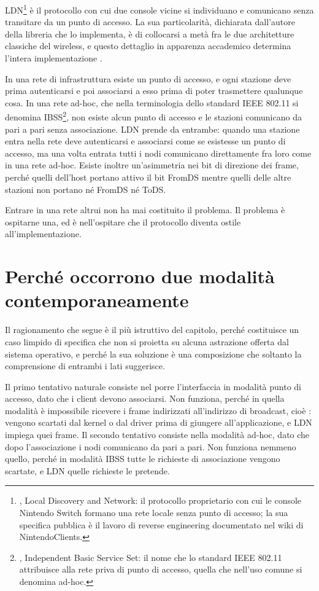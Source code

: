 LDN\footnote{, Local Discovery and Network: il protocollo proprietario con cui le console Nintendo Switch formano una rete locale senza punto di accesso; la sua specifica pubblica è il lavoro di reverse engineering documentato nel wiki di NintendoClients.} è il protocollo con cui due console vicine si individuano e comunicano senza transitare da un punto di accesso. La sua particolarità, dichiarata dall'autore della libreria che lo implementa, è di collocarsi a metà fra le due architetture classiche del wireless, e questo dettaglio in apparenza accademico determina l'intera implementazione \cite{kinnay-ldn}.

In una rete di infrastruttura esiste un punto di accesso, e ogni stazione deve prima autenticarsi e poi associarsi a esso prima di poter trasmettere qualunque cosa. In una rete ad-hoc, che nella terminologia dello standard IEEE 802.11 si denomina IBSS\footnote{, Independent Basic Service Set: il nome che lo standard IEEE 802.11 attribuisce alla rete priva di punto di accesso, quella che nell'uso comune si denomina ad-hoc.}, non esiste alcun punto di accesso e le stazioni comunicano da pari a pari senza associazione. LDN prende da entrambe: quando una stazione entra nella rete deve autenticarsi e associarsi come se esistesse un punto di accesso, ma una volta entrata tutti i nodi comunicano direttamente fra loro come in una rete ad-hoc. Esiste inoltre un'asimmetria nei bit di direzione dei frame, perché quelli dell'host portano attivo il bit FromDS mentre quelli delle altre stazioni non portano né FromDS né ToDS.

Entrare in una rete altrui non ha mai costituito il problema. Il problema è ospitarne una, ed è nell'ospitare che il protocollo diventa ostile all'implementazione.

\section{Perché occorrono due modalità contemporaneamente}

Il ragionamento che segue è il più istruttivo del capitolo, perché costituisce un caso limpido di specifica che non si proietta su alcuna astrazione offerta dal sistema operativo, e perché la sua soluzione è una composizione che soltanto la comprensione di entrambi i lati suggerisce.

Il primo tentativo naturale consiste nel porre l'interfaccia in modalità punto di accesso, dato che i client devono associarsi. Non funziona, perché in quella modalità è impossibile ricevere i frame indirizzati all'indirizzo di broadcast, cioè : vengono scartati dal kernel o dal driver prima di giungere all'applicazione, e LDN impiega quei frame. Il secondo tentativo consiste nella modalità ad-hoc, dato che dopo l'associazione i nodi comunicano da pari a pari. Non funziona nemmeno quello, perché in modalità IBSS tutte le richieste di associazione vengono scartate, e LDN quelle richieste le pretende.

